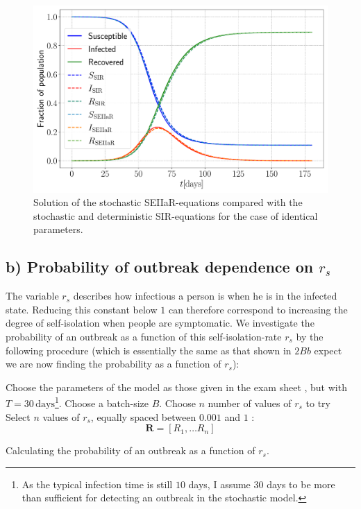 \begin{figure}[h!]
	\centering
	\includegraphics[width=0.8\columnwidth]{../fig/test_comparison.pdf}
	\caption{Solution of the stochastic SEIIaR-equations compared with the stochastic and deterministic SIR-equations for the case of identical parameters.}
	\label{fig:comparison_SIR}
\end{figure}
\newpage

\subsection{b) Probability of outbreak dependence on $r_s$}

The variable $r_s$ describes how infectious a person is when he is in the infected state. Reducing this constant below $1$ can therefore correspond to increasing the degree of self-isolation when people are symptomatic. We investigate the probability of an outbreak as a function of this self-isolation-rate $r_s$ by the following procedure (which is essentially the same as that shown in $2Bb$ expect we are now finding the probability as a function of $r_s$): 

\begin{algorithm}[H]
	Choose the parameters of the model as those given in the exam sheet \cite{sheet}, but with $T = 30 \, \mathrm{days}$\footnote{As the typical infection time is still $10$ days, I assume 30 days to be more than sufficient for detecting an outbreak in the stochastic model.}. \;
	Choose a batch-size $B$.\;
	Choose $n$ number of values of $r_s$ to try\;
	Select $n$ values of $r_s$, equally spaced between $0.001$ and $1$ :
		$$
			\mathbf{R} = [R_1, \dots R_n]
		$$
	\caption{Calculating the probability of an outbreak as a function of $r_s$.}
\end{algorithm} 

